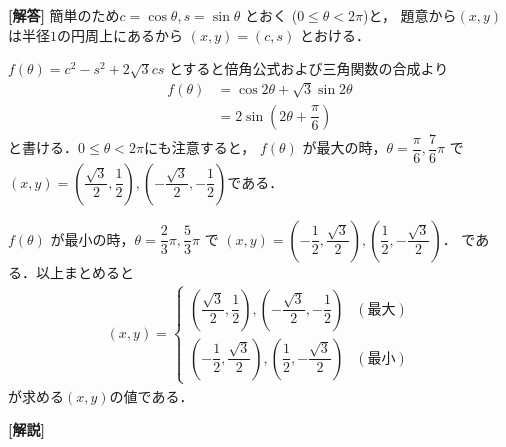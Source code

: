 \documentclass[../../main.tex]{subfiles}
\begin{document}
\begin{oframed}
  
\end{oframed}

{\bf [解答]}
簡単のため$c = \cos\theta, s = \sin\theta$ とおく ($0 \le \theta < 2\pi$)と，
題意から$(x,y)$は半径$1$の円周上にあるから $(x,y) = (c,s)$ とおける．

$f(\theta) = c^2 - s^2 + 2\sqrt{3}cs$ とすると倍角公式および三角関数の合成より
\begin{align}
  f(\theta)
  & = \cos 2\theta + \sqrt{3}\sin 2\theta \\
  &= 2\sin\left(2\theta + \dfrac{\pi}{6}\right)
\end{align}
と書ける．$0 \le \theta < 2\pi$にも注意すると，
$f(\theta)$ が最大の時，$\theta = \dfrac{\pi}{6}, \dfrac{7}{6}\pi$ で $(x,y) = \left(\dfrac{\sqrt{3}}{2}, \dfrac{1}{2}\right), \left(-\dfrac{\sqrt{3}}{2}, -\dfrac{1}{2}\right)$である．

$f(\theta)$ が最小の時，$\theta = \dfrac{2}{3}\pi, \dfrac{5}{3}\pi$ で $(x,y) = \left(-\dfrac{1}{2}, \dfrac{\sqrt{3}}{2}\right), \left(\dfrac{1}{2}, -\dfrac{\sqrt{3}}{2}\right)$．
である．以上まとめると
\begin{align}
  (x,y) =
  \begin{cases}
    \left(\dfrac{\sqrt{3}}{2}, \dfrac{1}{2}\right), \left(-\dfrac{\sqrt{3}}{2}, -\dfrac{1}{2}\right) & (\text{最大}) \\
    \left(-\dfrac{1}{2}, \dfrac{\sqrt{3}}{2}\right), \left(\dfrac{1}{2}, -\dfrac{\sqrt{3}}{2}\right) & (\text{最小})
  \end{cases}
\end{align}
が求める$(x,y)$の値である．

{\bf [解説]}
\end{document}
